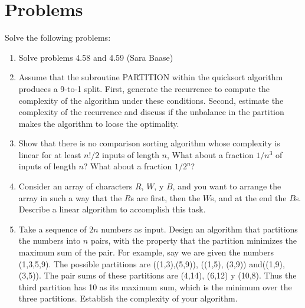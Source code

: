 \documentclass{article}
\begin{document}
\section{Problems}
Solve the following problems:
\begin{enumerate}
    \item Solve problems 4.58 and 4.59 (Sara Baase)

    \item Assume that the subroutine PARTITION within the quicksort algorithm produces a 9-to-1 split. First, generate the recurrence to compute the complexity of the algorithm under these conditions. Second, estimate  the  complexity  of  the  recurrence  and  discuss  if  the unbalance  in  the  partition  makes  the algorithm to loose the optimality.

    \item Show that there is no comparison sorting algorithm whose complexity is linear for at least $n!/2$ inputs of length $n$, What about a fraction $1/n^3$ of inputs of length $n$? What about a fraction $1/2^n$?

    \item Consider an array of characters $R$, $W$, y $B$, and you want to arrange the array in such a way that the $R$s are first, then the $W$s, and at the end the $B$s. Describe a linear algorithm to accomplish this task.

    \item Take a sequence of $2n$ numbers as input. Design an algorithm that partitions the numbers into $n$ pairs, with the property that the partition minimizes the maximum sum of the pair. For example, say we are given the numbers (1,3,5,9). The possible partitions are ((1,3),(5,9)), ((1,5), (3,9)) and((1,9),(3,5)). The pair sums of these partitions are (4,14), (6,12) y (10,8). Thus the third partition has 10 as its maximum sum, which is the minimum over the three partitions. Establish the complexity of your algorithm.
\end{enumerate}
\end{document}
